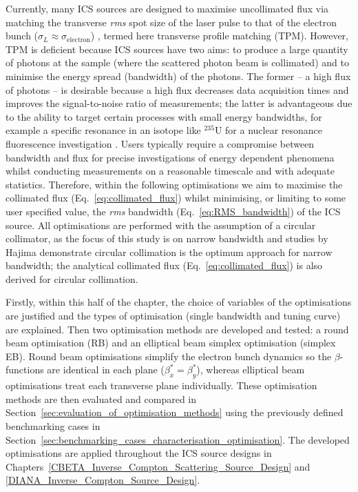 \documentclass[../main.tex]{subfiles}
\begin{document}
Currently, many ICS sources are designed to maximise uncollimated flux via matching the transverse \textit{rms} spot size of the laser pulse to that of the electron bunch ($\sigma_{L}\approx\sigma_{\mathrm{electron}}$) \cite{akagi2016narrow,deitrick2018high,jacquet2015radiation,drebot2019brixs,pan2019design,dupraz2020thomx}, termed here transverse profile matching (TPM). However, TPM is deficient because ICS sources have two aims: to produce a large quantity of photons at the sample (where the scattered photon beam is collimated) and to minimise the energy spread (bandwidth) of the photons. The former -- a high flux of photons -- is desirable because a high flux decreases data acquisition times and improves the signal-to-noise ratio of measurements; the latter is advantageous due to the ability to target certain processes with small energy bandwidths, for example a specific resonance in an isotope like $^{235}\mathrm{U}$ for a nuclear resonance fluorescence investigation \cite{hayakawa2010nondestructive}. Users typically require a compromise between bandwidth and flux for precise investigations of energy dependent phenomena whilst conducting measurements on a reasonable timescale and with adequate statistics. Therefore, within the following optimisations we aim to maximise the collimated flux (Eq.~\ref{eq:collimated_flux}) whilst minimising, or limiting to some user specified value, the \textit{rms} bandwidth (Eq.~\ref{eq:RMS_bandwidth}) of the ICS source. All optimisations are performed with the assumption of a circular collimator, as the focus of this study is on narrow bandwidth and studies by Hajima \cite{hajima2021bandwidth} demonstrate circular collimation is the optimum approach for narrow bandwidth; the analytical collimated flux (Eq.~\ref{eq:collimated_flux}) is also derived for circular collimation.

Firstly, within this half of the chapter, the choice of variables of the optimisations are justified and the types of optimisation (single bandwidth and tuning curve) are explained. Then two optimisation methods are developed and tested: a round beam optimisation (RB) and an elliptical beam simplex optimisation (simplex EB). Round beam optimisations simplify the electron bunch dynamics so the $\beta$-functions are identical in each plane ($\beta_{x}^{*}=\beta_{y}^{*}$), whereas elliptical beam optimisations treat each transverse plane individually. These optimisation methods are then evaluated and compared in Section~\ref{sec:evaluation_of_optimisation_methods} using the previously defined benchmarking cases in Section~\ref{sec:benchmarking_cases_characterisation_optimisation}. The developed optimisations are applied throughout the ICS source designs in Chapters~\ref{CBETA_Inverse_Compton_Scattering_Source_Design} and \ref{DIANA_Inverse_Compton_Source_Design}.    
\end{document}
